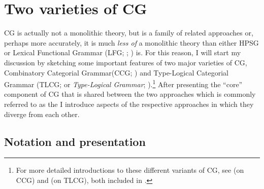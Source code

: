 \documentclass[output=paper,biblatex,babelshorthands,newtxmath,draftmode,colorlinks,citecolor=brown]{langscibook}
\begin{document}
\section{Two varieties of CG \label{cgexposition}}

\largerpage
CG is actually not a monolithic theory, but is a family of related
approaches \emdashUS or, perhaps more accurately, it is much \emph{less of} a
monolithic theory than either HPSG or Lexical Functional Grammar (LFG;
\citealt{KB82a-u,BATW2015a}; ) is. For this reason, I will
start my discussion by sketching some important features of two major
varieties of CG, Combinatory Categorial Grammar\indexccg (CCG;
\citealt{Steedman2000a-u,steedman2012}) and Type-Logical Categorial Grammar (TLCG; or \emph{Type-Logical Grammar};
\citealt{Morrill94a-u,Moortgat2011a-u,KubotaLevineBook}).\footnote{For 
more detailed introductions to these different variants of CG, see 
\citet{steedman2011ccg} (on CCG) and \citet{oehrle2011} (on 
TLCG), both included in \citet{BB2011a-ed}.} After presenting the ``core''
component of CG that is shared between the two approaches \emdashUS which is
commonly referred to as the  \emdashUS I introduce
aspects of the respective approaches in which they diverge from each
other.


\subsection{Notation and presentation }
\end{document}
